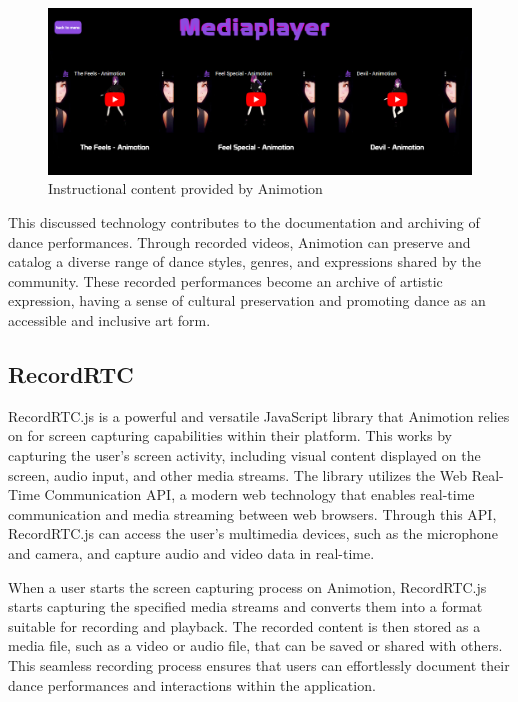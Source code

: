 \begin{figure}[htb]
  \centering
  \includegraphics[width=1\textwidth]{pics/exampleVids.png}
  \caption{Instructional content provided by Animotion}
  \label{fig:examplevids}
\end{figure}

This discussed technology contributes to the documentation and archiving of dance performances. Through recorded videos, Animotion can preserve and 
catalog a diverse range of dance styles, genres, and expressions shared by the community. These recorded performances become an archive of artistic expression, 
having a sense of cultural preservation and promoting dance as an accessible and inclusive art form.

\subsection{RecordRTC}
RecordRTC.js is a powerful and versatile JavaScript library that Animotion relies on for screen capturing capabilities within their platform.
This works by capturing the user's screen activity, including visual content displayed on the screen, audio input, 
and other media streams. The library utilizes the Web Real-Time Communication API, a modern web technology that enables real-time 
communication and media streaming between web browsers. Through this API, RecordRTC.js can access the user's multimedia devices, 
such as the microphone and camera, and capture audio and video data in real-time. \cite{rtcrecord}

When a user starts the screen capturing process on Animotion, RecordRTC.js starts capturing the specified media 
streams and converts them into a format suitable for recording and playback. The recorded content is then stored as a media file, 
such as a video or audio file, that can be saved or shared with others. This seamless recording process ensures that users can 
effortlessly document their dance performances and interactions within the application.

